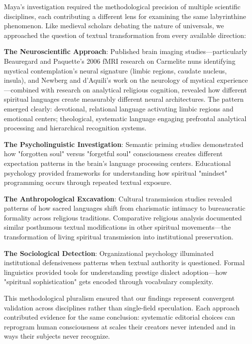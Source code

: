 \documentclass[12pt,twoside]{book}
\begin{document}
Maya's investigation required the methodological precision of multiple scientific disciplines, each contributing a different lens for examining the same labyrinthine phenomenon. Like medieval scholars debating the nature of universals, we approached the question of textual transformation from every available direction:

\textbf{\textbf{The Neuroscientific Approach}}: Published brain imaging studies—particularly Beauregard and Paquette's 2006 fMRI research on Carmelite nuns identifying mystical contemplation's neural signature (limbic regions, caudate nucleus, insula), and Newberg and d'Aquili's work on the neurology of mystical experience—combined with research on analytical religious cognition, revealed how different spiritual languages create measurably different neural architectures. The pattern emerged clearly: devotional, relational language activating limbic regions and emotional centers; theological, systematic language engaging prefrontal analytical processing and hierarchical recognition systems.

\textbf{\textbf{The Psycholinguistic Investigation}}: Semantic priming studies demonstrated how "forgotten soul" versus "forgetful soul" consciousness creates different expectation patterns in the brain's language processing centers. Educational psychology provided frameworks for understanding how spiritual "mindset" programming occurs through repeated textual exposure.

\textbf{\textbf{The Anthropological Excavation}}: Cultural transmission studies revealed patterns of how sacred languages shift from charismatic intimacy to bureaucratic formality across religious traditions. Comparative religious analysis documented similar posthumous textual modifications in other spiritual movements—the transformation of living spiritual transmission into institutional preservation.

\textbf{\textbf{The Sociological Detection}}: Organizational psychology illuminated institutional defensiveness patterns when textual authority is questioned. Formal linguistics provided tools for understanding prestige dialect adoption—how "spiritual sophistication" gets encoded through vocabulary complexity.

This methodological pluralism ensured that our findings represent convergent validation across disciplines rather than single-field speculation. Each approach contributed evidence for the same conclusion: systematic editorial choices can reprogram human consciousness at scales their creators never intended and in ways their subjects never recognize.
\end{document}
